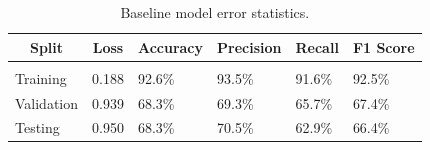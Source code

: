 \documentclass{article} %
\begin{document}
\begin{table}[t]
    \caption{Baseline model error statistics.}
    \label{baseline_stats}
    \begin{center}
        \begin{tabular}{llllll}
            \multicolumn{1}{c}{\bf Split} & \multicolumn{1}{c}{\bf Loss} & \multicolumn{1}{c}{\bf Accuracy} & \multicolumn{1}{c}{\bf Precision} & \multicolumn{1}{c}{\bf Recall} & \multicolumn{1}{c}{\bf F1 Score}
            \\ \hline \\
            Training                      & 0.188                        & 92.6\%                           & 93.5\%                            & 91.6\%                         & 92.5\%                           \\
            Validation                    & 0.939                        & 68.3\%                           & 69.3\%                            & 65.7\%                         & 67.4\%                           \\
            Testing                       & 0.950                        & 68.3\%                           & 70.5\%                            & 62.9\%                         & 66.4\%                           \\
        \end{tabular}
    \end{center}
\end{table}
\end{document}
